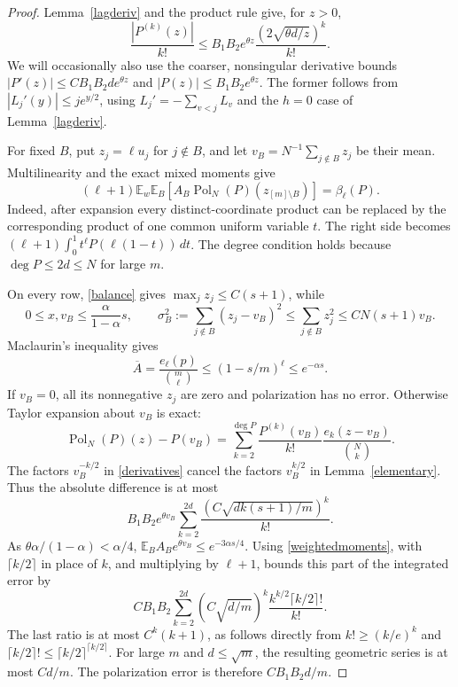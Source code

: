 \documentclass[11pt]{article}
\newcommand{\E}{\mathbb E}
\newcommand{\Pol}{\operatorname{Pol}}
\begin{document}
\begin{proof}
Lemma~\ref{lagderiv} and the product rule give, for $z>0$,
\begin{equation}\label{derivatives}
 \frac{|P^{(k)}(z)|}{k!}
 \le B_1B_2 e^{\theta z}\frac{(2\sqrt{\theta d/z})^k}{k!}.
\end{equation}
We will occasionally also use the coarser, nonsingular derivative
bounds $|P'(z)|\le C B_1B_2d e^{\theta z}$ and
$|P(z)|\le B_1B_2e^{\theta z}$. The former follows from
$|L_j'(y)|\le j e^{y/2}$, using
$L_j'=-\sum_{v<j}L_v$ and the $h=0$ case of Lemma~\ref{lagderiv}.

For fixed $B$, put $z_j=\ell u_j$ for $j\notin B$, and let
$v_B=N^{-1}\sum_{j\notin B}z_j$ be their mean.
Multilinearity and the exact mixed moments give
\begin{equation}\label{exactpolarization}
 (\ell+1)\E_w\E_B\left[A_B\Pol_N(P)(z_{[m]\setminus B})\right]
       =\beta_\ell(P).
\end{equation}
Indeed, after expansion every distinct-coordinate product can be
replaced by the corresponding product of one common uniform variable
$t$. The right side becomes
$(\ell+1)\int_0^1t^\ell P(\ell(1-t))\,dt$.
The degree condition holds because $\deg P\le2d\le N$ for large $m$.

On every row, \eqref{balance} gives $\max_jz_j\le C(s+1)$, while
\[
 0\le x,v_B\le\frac{\alpha}{1-\alpha}s,
 \qquad
 \sigma_B^2:=\sum_{j\notin B}(z_j-v_B)^2
       \le\sum_{j\notin B}z_j^2\le C N(s+1)v_B.
\]
Maclaurin's inequality gives
\begin{equation}\label{abar}
 \overline A=\frac{e_\ell(p)}{\binom m\ell}
       \le(1-s/m)^\ell\le e^{-\alpha s}.
\end{equation}
If $v_B=0$, all its nonnegative $z_j$ are zero and polarization has
no error. Otherwise Taylor expansion about $v_B$ is exact:
\[
 \Pol_N(P)(z)-P(v_B)
 =\sum_{k=2}^{\deg P}\frac{P^{(k)}(v_B)}{k!}
                 \frac{e_k(z-v_B)}{\binom Nk}.
\]
The factors $v_B^{-k/2}$ in \eqref{derivatives} cancel the factors
$v_B^{k/2}$ in Lemma~\ref{elementary}. Thus the absolute difference
is at most
\[
 B_1B_2e^{\theta v_B}
       \sum_{k=2}^{2d}\frac{(C\sqrt{dk(s+1)/m})^k}{k!}.
\]
As $\theta\alpha/(1-\alpha)<\alpha/4$,
$\E_B A_B e^{\theta v_B}\le e^{-3\alpha s/4}$.
Using \eqref{weightedmoments}, with $\lceil k/2\rceil$ in place of
$k$, and multiplying by $\ell+1$, bounds this part of the integrated
error by
\[
 C B_1B_2\sum_{k=2}^{2d}
       (C\sqrt{d/m})^k
       \frac{k^{k/2}\lceil k/2\rceil!}{k!}.
\]
The last ratio is at most $C^k(k+1)$, as follows directly from
$k!\ge(k/e)^k$ and $\lceil k/2\rceil!\le\lceil k/2\rceil^{\lceil k/2\rceil}$.
For large $m$ and $d\le\sqrt m$, the resulting geometric series
is at most $Cd/m$. The polarization error is therefore
$CB_1B_2d/m$.


\end{proof}
\end{document}

